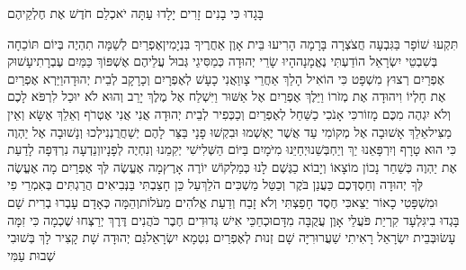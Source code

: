\documentclass[../main/main.tex]{subfiles}
\begin{document}
\begin{multicols}{\ncols}
בָּגָדוּ כִּי בָנִים זָרִים יָלָדוּ עַתָּה יֹאכְלֵם חֹדֶשׁ אֶת חֶלְקֵיהֶם\OpenSection{}\par
{}תִּקְעוּ שׁוֹפָר בַּגִּבְעָה חֲצֹצְרָה בָּרָמָה הָרִיעוּ בֵּית אָוֶן אַחֲרֶיךָ בִּנְיָמִין\PreVerseSpace{}אֶפְרַיִם לְשַׁמָּה תִהְיֶה בְּיוֹם תּוֹכֵחָה בְּשִׁבְטֵי יִשְׂרָאֵל הוֹדַעְתִּי נֶאֱמָנָה\PreVerseSpace{}הָיוּ שָׂרֵי יְהוּדָה כְּמַסִּיגֵי גְּבוּל עֲלֵיהֶם אֶשְׁפּוֹךְ כַּמַּיִם עֶבְרָתִי\PreVerseSpace{}עָשׁוּק אֶפְרַיִם רְצוּץ מִשְׁפָּט כִּי הוֹאִיל הָלַךְ אַחֲרֵי צָו\PreVerseSpace{}וַאֲנִי כָעָשׁ לְאֶפְרָיִם וְכָרָקָב לְבֵית יְהוּדָה\PreVerseSpace{}וַיַּרְא אֶפְרַיִם אֶת חָלְיוֹ וִיהוּדָה אֶת מְזֹרוֹ וַיֵּלֶךְ אֶפְרַיִם אֶל אַשּׁוּר וַיִּשְׁלַח אֶל מֶלֶךְ יָרֵב וְהוּא לֹא יוּכַל לִרְפֹּא לָכֶם וְלֹא יִגְהֶה מִכֶּם מָזוֹר\PreVerseSpace{}כִּי אָנֹכִי כַשַּׁחַל לְאֶפְרַיִם וְכַכְּפִיר לְבֵית יְהוּדָה אֲנִי אֲנִי אֶטְרֹף וְאֵלֵךְ אֶשָּׂא וְאֵין מַצִּיל\PreVerseSpace{}אֵלֵךְ אָשׁוּבָה אֶל מְקוֹמִי עַד אֲשֶׁר יֶאְשְׁמוּ וּבִקְשׁוּ פָנָי בַּצַּר לָהֶם יְשַׁחֲרֻנְנִי\PreChapterSpace{}לְכוּ וְנָשׁוּבָה אֶל יַהְוֶה כִּי הוּא טָרָף וְיִרְפָּאֵנוּ יַךְ וְיַחְבְּשֵׁנוּ\PreVerseSpace{}יְחַיֵּנוּ מִיֹּמָיִם בַּיּוֹם הַשְּׁלִישִׁי יְקִמֵנוּ וְנִחְיֶה לְפָנָיו\PreVerseSpace{}וְנֵדְעָה נִרְדְּפָה לָדַעַת אֶת יַהְוֶה כְּשַׁחַר נָכוֹן מוֹצָאוֹ וְיָבוֹא כַגֶּשֶׁם לָנוּ כְּמַלְקוֹשׁ יוֹרֶה אָרֶץ\PreVerseSpace{}מָה אֶעֱשֶׂה לְּךָ אֶפְרַיִם מָה אֶעֱשֶׂה לְּךָ יְהוּדָה וְחַסְדְּכֶם כַּעֲנַן בֹּקֶר וְכַטַּל מַשְׁכִּים הֹלֵךְ\PreVerseSpace{}עַל כֵּן חָצַבְתִּי בַּנְּבִיאִים הֲרַגְתִּים בְּאִמְרֵי פִי וּמִשְׁפָּטִי כָאוֹר\SubEnd{} יֵצֵא\PreVerseSpace{}כִּי חֶסֶד חָפַצְתִּי וְלֹא זָבַח וְדַעַת אֱלֹהִים מֵעֹלוֹת\PreVerseSpace{}וְהֵמָּה כְּאָדָם עָבְרוּ בְרִית שָׁם בָּגְדוּ בִי\PreVerseSpace{}גִּלְעָד קִרְיַת פֹּעֲלֵי אָוֶן עֲקֻבָּה מִדָּם\PreVerseSpace{}וּכְחַכֵּי אִישׁ גְּדוּדִים חֶבֶר כֹּהֲנִים דֶּרֶךְ יְרַצְּחוּ שֶׁכְמָה כִּי זִמָּה עָשׂוּ\PreVerseSpace{}בְּבֵית יִשְׂרָאֵל רָאִיתִי שַׁעֲרוּרִיָּה\SubEnd{} שָׁם זְנוּת לְאֶפְרַיִם נִטְמָא יִשְׂרָאֵל\PreVerseSpace{}גַּם יְהוּדָה שָׁת קָצִיר לָךְ בְּשׁוּבִי שְׁבוּת עַמִּי\OpenSection{}\par

\end{multicols}
\end{document}
